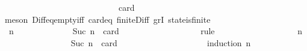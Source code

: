 \begin{isabellebody}
\ \ \ \ \isamarkupfalse%
\ {\isacharminus}\ \isanewline
\ \ \ \ \ \ \isamarkupfalse%
\ {\isachardoublequoteopen}{\isasymforall}\ {\isasymsigma}\ {\isasymin}\ {\isasymSigma}{\isachardot}\ {\isasymforall}\ {\isasymsigma}{\isacharprime}\ {\isasymin}\ {\isasymSigma}{\isachardot}\ {\isasymnot}\ {\isasymsigma}\ {\isasymsubseteq}\ {\isasymsigma}{\isacharprime}\ {\isasymlongrightarrow}\ card\ {\isacharparenleft}{\isasymsigma}\ {\isacharminus}\ {\isasymsigma}{\isacharprime}{\isacharparenright}\ {\isachargreater}\ {}{\isachardoublequoteclose}\isanewline
\ \ \ \ \ \ \ \ \isamarkupfalse%
\ {\isacharparenleft}meson\ Diff{\isacharunderscore}eq{\isacharunderscore}empty{\isacharunderscore}iff\ card{\isacharunderscore}{}{\isacharunderscore}eq\ finite{\isacharunderscore}Diff\ gr{}I\ state{\isacharunderscore}is{\isacharunderscore}finite{\isacharparenright}\isanewline
\ \ \ \ \ \ \isamarkupfalse%
\ {\isachardoublequoteopen}{\isasymforall}\ n{\isachardot}\ {\isasymforall}\ {\isasymsigma}\ {\isasymin}\ {\isasymSigma}{\isachardot}\ {\isasymforall}\ {\isasymsigma}{\isacharprime}\ {\isasymin}\ {\isasymSigma}{\isachardot}\ {\isasymnot}\ {\isasymsigma}\ {\isasymsubseteq}\ {\isasymsigma}{\isacharprime}\ {\isasymand}\ Suc\ n\ {\isacharequal}\ card\ {\isacharparenleft}{\isasymsigma}\ {\isacharminus}\ {\isasymsigma}{\isacharprime}{\isacharparenright}{\isasymlongrightarrow}\ \ {\isasymsigma}\ {\isasymunion}\ {\isasymsigma}{\isacharprime}\ {\isasymin}\ {\isasymSigma}{\isachardoublequoteclose}\isanewline
\ \ \ \ \ \ \ \ \isamarkupfalse%
\ {\isacharparenleft}rule{\isacharparenright}\isanewline
\ \ \ \ \ \ \isamarkupfalse%
\ {\isacharminus}\ \isanewline
\ \ \ \ \ \ \ \ \isamarkupfalse%
\ n\isanewline
\ \ \ \ \ \ \ \ \isamarkupfalse%
\ {\isachardoublequoteopen}{\isasymforall}{\isasymsigma}{\isasymin}{\isasymSigma}{\isachardot}\ {\isasymforall}{\isasymsigma}{\isacharprime}{\isasymin}{\isasymSigma}{\isachardot}\ {\isasymnot}\ {\isasymsigma}\ {\isasymsubseteq}\ {\isasymsigma}{\isacharprime}\ {\isasymand}\ Suc\ n\ {\isacharequal}\ card\ {\isacharparenleft}{\isasymsigma}\ {\isacharminus}\ {\isasymsigma}{\isacharprime}{\isacharparenright}\ {\isasymlongrightarrow}\ {\isasymsigma}\ {\isasymunion}\ {\isasymsigma}{\isacharprime}\ {\isasymin}\ {\isasymSigma}{\isachardoublequoteclose}\isanewline
\ \ \ \ \ \ \ \ \ \ \isamarkupfalse%
\ {\isacharparenleft}induction\ n{\isacharparenright}\isanewline
\ \ \ \ \ \ \ \ \ \ \isamarkupfalse%

\end{isabellebody}
